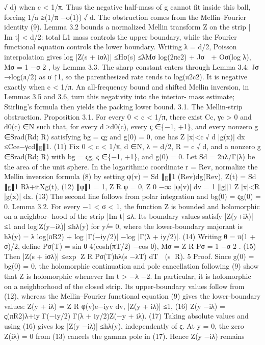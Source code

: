 √
d) when c < 1/π. Thus the
negative half-mass of g cannot ﬁt inside this ball, forcing 1/a ≥(1/π −o(1))
√
d.
The obstruction comes from the Mellin–Fourier identity (9). Lemma 3.2 bounds a normalized
Mellin transform Z on the strip | Im t| < d/2: total L1 mass controls the upper boundary,
while the Fourier functional equation controls the lower boundary. Writing λ = d/2, Poisson
interpolation gives
log |Z(s + iσλ)| ≤Hσ(s) ≤λMσ
 log(2πc2) + Jσ
 + Oσ(log λ),
Mσ = 1 −σ
2
,
by Lemma 3.3. The sharp constant enters through Lemma 3.4: Jσ →log(π/2) as σ ↑1, so the
parenthesized rate tends to log(π2c2). It is negative exactly when c < 1/π. An all-frequency
bound and shifted Mellin inversion, in Lemmas 3.5 and 3.6, turn this negativity into the interior-
mass estimate; Stirling’s formula then yields the packing lower bound.
3.1. The Mellin-strip obstruction.
Proposition 3.1. For every 0 < c < 1/π, there exist Cc, γc > 0 and d0(c) ∈N such that, for
every d ≥d0(c), every ς ∈\{−1, +1\}, and every nonzero g ∈Srad(Rd; R) satisfying bg = ςg and
g(0) = 0, one has
Z
|x|<c
√
d
|g(x)| dx ≤Cce−γcd∥g∥1.
(11)
Fix 0 < c < 1/π, d ∈N, λ = d/2, R = c
√
d, and a nonzero g ∈Srad(Rd; R) with bg = ςg,
ς ∈\{−1, +1\}, and g(0) = 0.
Let Sd = 2πλ/Γ(λ) be the area of the unit sphere.
In the
logarithmic coordinate r = Rev, normalize the Mellin inversion formula (8) by setting
φ(v) =
Sd
∥g∥1
(Rev)dg(Rev),
Z(t) =
Sd
∥g∥1
Rλ+itXg(t),
(12)
∥φ∥1 = 1,
Z
R
φ = 0,
Z 0
−∞
|φ(v)| dv =
1
∥g∥1
Z
|x|<R
|g(x)| dx.
(13)
The second line follows from polar integration and bg(0) = ςg(0) = 0.
Lemma 3.2. For every −1 < σ < 1, the function Z is bounded and holomorphic on a neighbor-
hood of the strip |Im t| ≤λ. Its boundary values satisfy |Z(y+iλ)| ≤1 and log|Z(y−iλ)| ≤hλ(y)
for y ̸= 0, where the lower-boundary majorant is
hλ(y) = λ log(πR2) + log |Γ(−iy/2)| −log |Γ(λ + iy/2)|.
(14)
Writing θ = π(1 + σ)/2, deﬁne
Pσ(T) =
sin θ
4(cosh(πT/2) −cos θ),
Mσ =
Z
R
Pσ = 1 −σ
2
.
(15)
Then
|Z(s + iσλ)| ≤exp
Z
R
Pσ(T)hλ(s −λT) dT

(s ∈R).
5
Proof. Since g(0) = bg(0) = 0, the holomorphic continuation and pole cancellation following
(9) show that Z is holomorphic whenever Im t > −λ −2. In particular, it is holomorphic on
a neighborhood of the closed strip. Its upper-boundary values follow from (12), whereas the
Mellin–Fourier functional equation (9) gives the lower-boundary values:
Z(y + iλ) =
Z
R
φ(v)e−iyv dv,
|Z(y + iλ)| ≤1,
(16)
Z(y −iλ) = ς(πR2)λ+iy Γ(−iy/2)
Γ(λ + iy/2)Z(−y + iλ).
(17)
Taking absolute values and using (16) gives log |Z(y −iλ)| ≤hλ(y), independently of ς. At
y = 0, the zero Z(iλ) = 0 from (13) cancels the gamma pole in (17). Hence Z(y −iλ) remains
